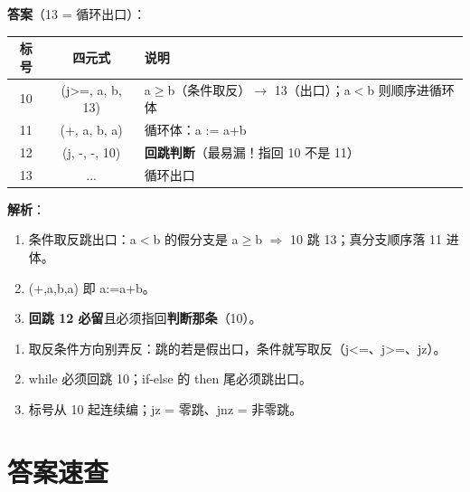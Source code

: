 \documentclass[12pt,a4paper,fontset=windows]{ctexart}
\begin{document}
\textbf{答案}（13 = 循环出口）：

\begin{center}
\renewcommand{\arraystretch}{1.25}
\begin{tabular}{c c p{8.2cm}}
\toprule
\textbf{标号} & \textbf{四元式} & \textbf{说明} \\
\midrule
10 & (j>=, a, b, 13) & a$\ge$b（条件取反）$\to$ 13（出口）；a$<$b 则顺序进循环体 \\
11 & (+, a, b, a) & 循环体：a := a+b \\
12 & (j, -, -, 10) & \textbf{回跳判断}（最易漏！指回 10 不是 11） \\
13 & ... & 循环出口 \\
\bottomrule
\end{tabular}
\end{center}

\textbf{解析}：
\begin{enumerate}
\item 条件取反跳出口：a$<$b 的假分支是 a$\ge$b $\Rightarrow$ 10 跳 13；真分支顺序落 11 进体。
\item (+,a,b,a) 即 a:=a+b。
\item \textbf{回跳 12 必留}且必须指回\textbf{判断那条}（10）。
\end{enumerate}

\begin{warnbox}[四元式易错]
\begin{enumerate}
\item 取反条件方向别弄反：跳的若是假出口，条件就写取反（j<=、j>=、jz）。
\item while 必须回跳 10；if-else 的 then 尾必须跳出口。
\item 标号从 10 起连续编；jz = 零跳、jnz = 非零跳。
\end{enumerate}
\end{warnbox}

\section{答案速查}
\end{document}
